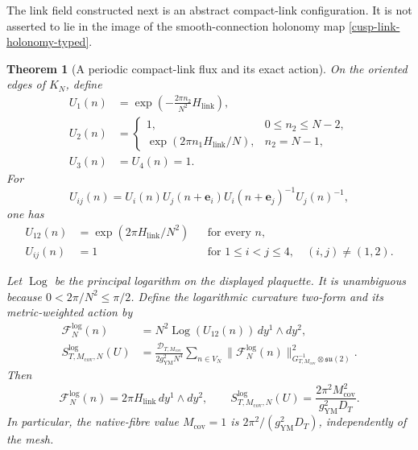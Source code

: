 \documentclass[11pt]{article}
\newtheorem{theorem}{Theorem}[section]
\theoremstyle{definition}
\numberwithin{equation}{section}
\begin{document}
The link field constructed next is an abstract compact-link configuration.
It is not asserted to lie in the image of the smooth-connection holonomy map
\eqref{cusp-link-holonomy-typed}.

\begin{theorem}[A periodic compact-link flux and its exact action]
\label{cusp-link-flux-theorem}
On the oriented edges of \(K_N\), define
\begin{align}
 U_1(n)&=\exp\left(-\frac{2\pi n_2}{N^2}H_{\mathrm{link}}\right),
 \label{cusp-link-flux-u1}\\
 U_2(n)&=
 \begin{cases}
  1,&0\leq n_2\leq N-2,\\[1mm]
  \exp(2\pi n_1H_{\mathrm{link}}/N),&n_2=N-1,
 \end{cases}
 \label{cusp-link-flux-u2}\\
 U_3(n)&=U_4(n)=1.
 \label{cusp-link-flux-u34}
\end{align}
For
\begin{equation}
 U_{ij}(n)=U_i(n)U_j(n+\mathbf e_i)
            U_i(n+\mathbf e_j)^{-1}U_j(n)^{-1},
 \label{cusp-link-plaquette-convention}
\end{equation}
one has
\begin{equation}
 \begin{aligned}
 U_{12}(n)&=\exp(2\pi H_{\mathrm{link}}/N^2)
 &&\text{for every }n,\\
 U_{ij}(n)&=1
 &&\text{for }1\leq i<j\leq4,\quad(i,j)\neq(1,2).
 \end{aligned}
 \label{cusp-link-plaquette-values}
\end{equation}

Let \(\operatorname{Log}\) be the principal logarithm on the displayed
plaquette.  It is unambiguous because \(0<2\pi/N^2\leq\pi/2\).  Define
the logarithmic curvature two-form and its metric-weighted action by
\begin{align}
 \mathcal F_N^{\log}(n)
 &=N^2\operatorname{Log}(U_{12}(n))\,dy^1\wedge dy^2,
 \label{cusp-link-log-curvature}\\
 S^{\log}_{T,M_{\mathrm{cov}},N}(U)
 &=\frac{\mathcal D_{T,M_{\mathrm{cov}}}}{2g_{\mathrm{YM}}^2N^4}
   \sum_{n\in V_N}
   \lVert\mathcal F_N^{\log}(n)\rVert^2_{
       G_{T,M_{\mathrm{cov}}}^{-1}\otimes\mathfrak{su}(2)}.
 \label{cusp-link-log-action}
\end{align}
Then
\begin{equation}
 \mathcal F_N^{\log}(n)=2\pi H_{\mathrm{link}}\,dy^1\wedge dy^2,
 \qquad
 S^{\log}_{T,M_{\mathrm{cov}},N}(U)
 =\frac{2\pi^2M_{\mathrm{cov}}^2}{g_{\mathrm{YM}}^2D_T}.
 \label{cusp-link-log-action-value}
\end{equation}
In particular, the native-fibre value \(M_{\mathrm{cov}}=1\) is
\(2\pi^2/(g_{\mathrm{YM}}^2D_T)\), independently of the mesh.


\end{theorem}
\end{document}
